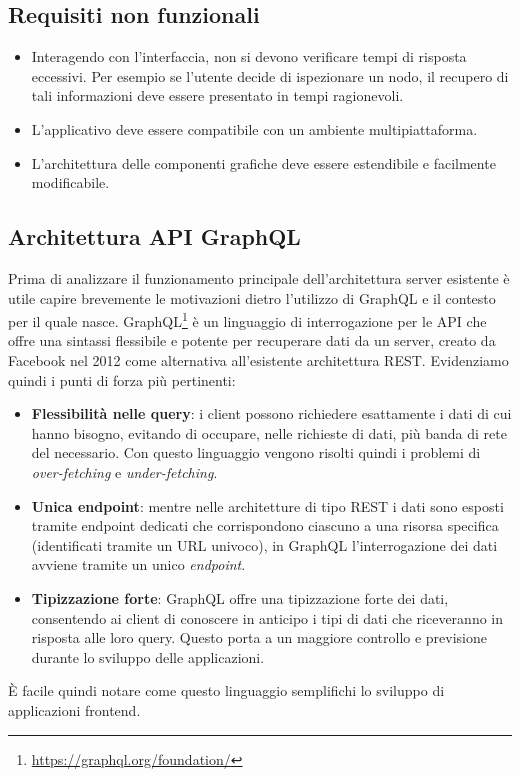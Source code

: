 \subsection{Requisiti non funzionali}
\begin{itemize}
	\item Interagendo con l'interfaccia, non si devono verificare tempi di risposta eccessivi. Per esempio se l'utente decide di ispezionare un nodo, il recupero di tali informazioni deve essere presentato in tempi ragionevoli.
	\item L'applicativo deve essere compatibile con un ambiente multipiattaforma.
	\item L'architettura delle componenti grafiche deve essere estendibile e facilmente modificabile.
\end{itemize}

\subsection{Architettura API GraphQL}
Prima di analizzare il funzionamento principale dell'architettura server esistente è utile capire brevemente le motivazioni dietro l'utilizzo di GraphQL e il contesto per il quale nasce. GraphQL\footnote{\url{https://graphql.org/foundation/}} è un linguaggio di interrogazione per le \ac{API} che offre una sintassi flessibile e potente per recuperare dati da un server, creato da Facebook nel 2012 come alternativa all'esistente architettura \ac{REST}. Evidenziamo quindi i punti di forza più pertinenti:
\begin{itemize}
	\item \textbf{Flessibilità nelle query}: i client possono richiedere esattamente i dati di cui hanno bisogno, evitando di occupare, nelle richieste di dati, più banda di rete del necessario. Con questo linguaggio vengono risolti quindi i problemi di \textit{over-fetching} e \textit{under-fetching}.
	\item \textbf{Unica endpoint}:  mentre nelle architetture di tipo \ac{REST} i dati sono esposti tramite endpoint dedicati che corrispondono ciascuno a una risorsa specifica (identificati tramite un \ac{URL} univoco), in GraphQL l'interrogazione dei dati avviene tramite un unico \textit{endpoint}.
	\item \textbf{Tipizzazione forte}: GraphQL offre una tipizzazione forte dei dati, consentendo ai client di conoscere in anticipo i tipi di dati che riceveranno in risposta alle loro query. Questo porta a un maggiore controllo e previsione durante lo sviluppo delle applicazioni.
\end{itemize}
È facile quindi notare come questo linguaggio semplifichi lo sviluppo di applicazioni frontend.

